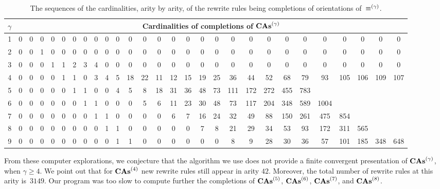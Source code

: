 \begin{table}[ht]
    \centering
    \footnotesize
    \setlength{\tabcolsep}{.35em}
    \begin{tabular}{c||ccccccccccccccccccccccccccc}
        $\gamma$ & \multicolumn{27}{c}{
        Cardinalities of completions of $\mathbf{CAs}^{\left(\gamma\right)}$}
        \\ \hline \hline
        1 & 0 & 0 & 0 & 0 & 0 & 0 & 0 & 0 & 0 & 0 & 0 & 0 & 0 & 0 & 0
        & 0 & 0 & 0 & 0 & 0 & 0 & 0 & 0 & 0 & 0 & 0 & 0
        \\
        2 & 0 & 0 & 1 & 0 & 0 & 0 & 0 & 0 & 0 & 0 & 0 & 0 & 0 & 0 & 0
        & 0 & 0 & 0 & 0 & 0 & 0 & 0 & 0 & 0 & 0 & 0 & 0
        \\
        3 & 0 & 0 & 0 & 1 & 1 & 2 & 3 & 4 & 0 & 0 & 0 & 0 & 0 & 0 & 0
        & 0 & 0 & 0 & 0 & 0 & 0 & 0 & 0 & 0 & 0 & 0 & 0
        \\
        4 & 0 & 0 & 0 & 0 & 1 & 1 & 0 & 3 & 4 & 5 & 18 & 22 & 11 & 12
        & 15 & 19 & 25 & 36 & 44 & 52 & 68 & 79 & 93 & 105 & 106 & 109
        & 107
        \\
        5 & 0 & 0 & 0 & 0 & 0 & 1 & 1 & 0 & 0 & 4 & 5 & 8 & 18 & 31
        & 36 & 48 & 73 & 111 & 172 & 272 & 455 & 783
        \\
        6 & 0 & 0 & 0 & 0 & 0 & 0 & 1 & 1 & 0 & 0 & 0 & 5 & 6 & 11
        & 23 & 30 & 48 & 73 & 117 & 204 & 348 & 589 & 1004
        \\
        7 & 0 & 0 & 0 & 0 & 0 & 0 & 0 & 1 & 1 & 0 & 0 & 0 & 0 & 6 & 7
        & 16 & 24 & 32 & 49 & 88 & 150 & 261 & 475 & 854
        \\
        8 & 0 & 0 & 0 & 0 & 0 & 0 & 0 & 0 & 1 & 1 & 0 & 0 & 0 & 0 & 0
        & 7 & 8 & 21 & 29 & 34 & 53 & 93 & 172 & 311 & 565
        \\
        9 & 0 & 0 & 0 & 0 & 0 & 0 & 0 & 0 & 0 & 1 & 1 & 0 & 0 & 0 & 0
        & 0 & 0 & 8 & 9 & 28 & 30 & 36 & 57 & 101 & 185 & 348 & 648
    \end{tabular}
    \caption{\footnotesize
    The sequences of the cardinalities, arity by arity, of the rewrite
    rules being completions of orientations of~$\operatorname{\equiv}^{\left(\gamma\right)}$.}
    \label{tab:cardinalities_completion_CAs}
\end{table}
    
From these computer explorations, we conjecture that the algorithm we
use does not provide a finite convergent presentation of $\mathbf{CAs}^{\left(\gamma\right)}$,
when $\gamma \geq 4$. We point out that for $\mathbf{CAs}^{\left(4\right)}$ new rewrite
rules still appear in arity $42$. Moreover, the total number of rewrite
rules at this arity is~$3149$. Our program was too slow to 
compute further the completions of $\mathbf{CAs}^{\left(5\right)}$, $\mathbf{CAs}^{\left(6\right)}$, $\mathbf{CAs}^{\left(7\right)}$, and
$\mathbf{CAs}^{\left(8\right)}$.
\medbreak

